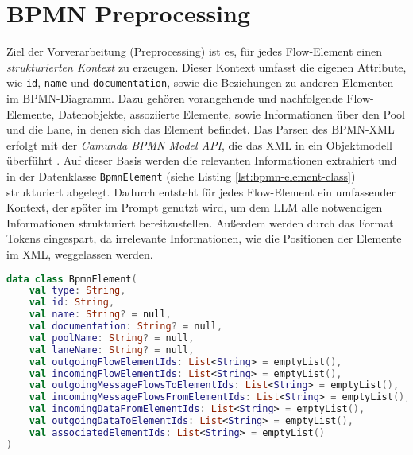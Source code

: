 \section{BPMN Preprocessing}\label{sec:bpmn-preprocessing}

Ziel der Vorverarbeitung (Preprocessing) ist es, für jedes Flow-Element einen \emph{strukturierten Kontext} zu erzeugen. Dieser Kontext umfasst die eigenen Attribute, wie \texttt{id}, \texttt{name} und \texttt{documentation}, sowie die Beziehungen zu anderen Elementen im BPMN-Diagramm. Dazu gehören vorangehende und nachfolgende Flow-Elemente, Datenobjekte, assoziierte Elemente, sowie Informationen über den Pool und die Lane, in denen sich das Element befindet. Das Parsen des \ac{BPMN}-XML erfolgt mit der \emph{Camunda BPMN Model API}, die das XML in ein Objektmodell überführt \cite{camunda-bpmn-model-api, camunda-bpmn-model-read}. Auf dieser Basis werden die relevanten Informationen extrahiert und in der Datenklasse \texttt{BpmnElement} (siehe Listing \ref{lst:bpmn-element-class}) strukturiert abgelegt. Dadurch entsteht für jedes Flow-Element ein umfassender Kontext, der später im Prompt genutzt wird, um dem \ac{LLM} alle notwendigen Informationen strukturiert bereitzustellen. Außerdem werden durch das Format Tokens eingespart, da irrelevante Informationen, wie die Positionen der Elemente im XML, weggelassen werden.

\begin{lstlisting}[language=Kotlin,caption={Interne \ac{BPMN}-Repräsentation je Flow-Element.},label={lst:bpmn-element-class}]
data class BpmnElement(
    val type: String,
    val id: String,
    val name: String? = null,
    val documentation: String? = null,
    val poolName: String? = null,
    val laneName: String? = null,
    val outgoingFlowElementIds: List<String> = emptyList(),
    val incomingFlowElementIds: List<String> = emptyList(),
    val outgoingMessageFlowsToElementIds: List<String> = emptyList(),
    val incomingMessageFlowsFromElementIds: List<String> = emptyList(),
    val incomingDataFromElementIds: List<String> = emptyList(),
    val outgoingDataToElementIds: List<String> = emptyList(),
    val associatedElementIds: List<String> = emptyList()
)
\end{lstlisting}